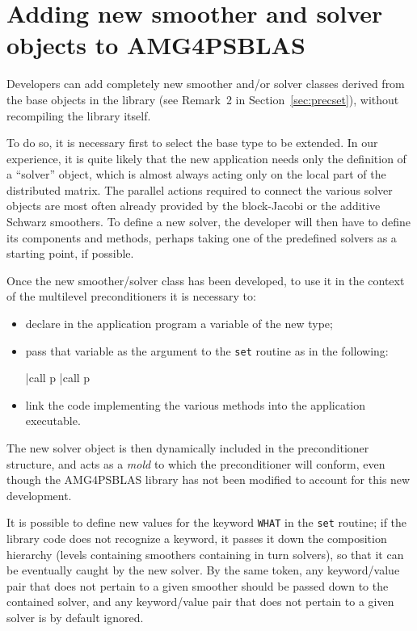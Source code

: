 
\clearpage

\section{Adding new smoother and solver objects to AMG4PSBLAS\label{sec:adding}}

Developers can add completely new smoother and/or solver classes
derived from the base objects in the library (see Remark~2 in Section~\ref{sec:precset}),
without recompiling the library itself.

To do so, it is necessary first to select the base type to be extended.
In our experience, it is quite likely that the new application needs
only the definition of a ``solver'' object, which is almost
always acting only on the local part of the distributed matrix.
The parallel actions required to connect the various solver objects
are most often already provided by the block-Jacobi or the additive
Schwarz smoothers.  To define a new solver, the developer will then
have to define its components and methods, perhaps taking one of the
predefined solvers as a starting point, if possible.

Once the new smoother/solver class has been developed, to use it in
the context of the multilevel preconditioners it is necessary to:
\begin{itemize}
\item declare in the application program a variable of the new type;
\item  pass that variable as the argument to the \verb|set| routine as in the
following:
\begin{center}
\fortinline|call p%
\fortinline|call p%
\end{center}
\item link the code implementing the various methods into the application executable.
\end{itemize}
The new solver object is then dynamically included in the
preconditioner structure, and acts as a \emph{mold} to which the
preconditioner will conform, even though the AMG4PSBLAS library has not
been modified to account for this new development.

It is possible to define new values for the keyword \verb|WHAT| in the
\verb|set| routine; if the library code does not recognize a keyword,
it passes it down the composition hierarchy (levels containing
smoothers containing in turn solvers), so that it can be eventually caught by
the new solver. By the same token, any keyword/value pair that does not pertain to
a given smoother should be passed down to the contained solver, and
any keyword/value pair that does not pertain to a given solver is by
default ignored.

